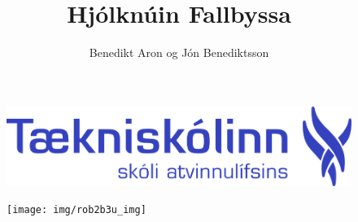 \documentclass{article}
\begin{document}
\pagestyle{fancy}
\fancyhf{}
\rfoot{\thepage}
\title{Hjólknúin Fallbyssa}
\author{Benedikt Aron og Jón Benediktsson}
\maketitle
\begin{figure}[h]
\centering
\includegraphics[scale=.23]{img/logo-footer}
\end{figure}
\begin{figure}[h]
\centering
\texttt{[image: img/rob2b3u\_img]}
\end{figure}
\newpage
\tableofcontents
\newpage



\newpage



\newpage

\end{document}
